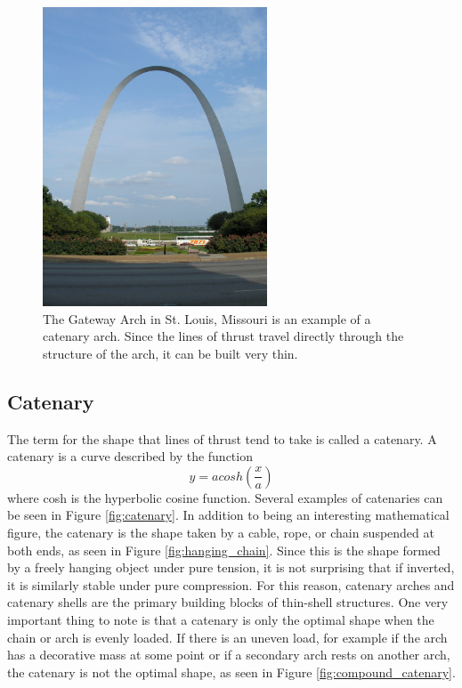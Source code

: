 \documentclass{thesis}
\begin{document}
\begin{figure}
\centering
\includegraphics[height=3.5in]{images/gateway_arch.jpg}
\caption[The Gateway Arch]{The Gateway Arch in St. Louis, Missouri is an example of a catenary arch.  Since the lines of thrust travel directly
through the structure of the arch, it can be built very thin. \cite{img:gateway_arch}}
\label{fig:gateway_arch}
\end{figure}

\subsection{Catenary} \label{sec:catenary}
The term for the shape that lines of thrust tend to take is called a catenary.  A catenary is a curve described by the function
\[y=a cosh(\frac{x}{a})\]
where cosh is the hyperbolic cosine function.  Several examples of catenaries can be seen in Figure \ref{fig:catenary}.  In addition to being
an interesting mathematical figure, the catenary is the shape taken by a cable, rope, or chain suspended at both ends, as seen in Figure
\ref{fig:hanging_chain}.  Since this is the shape formed by a freely hanging object under pure tension, it is not surprising that if inverted,
it is similarly stable under pure compression.  For this reason, catenary arches and catenary shells are the primary building blocks of
thin-shell structures.  One very important thing to note is that a catenary is only the optimal shape when the chain or arch is evenly loaded.
If there is an uneven load, for example if the arch has a decorative mass at some point or if a secondary arch rests on another arch, the
catenary is not the optimal shape, as seen in Figure \ref{fig:compound_catenary}.
\end{document}
